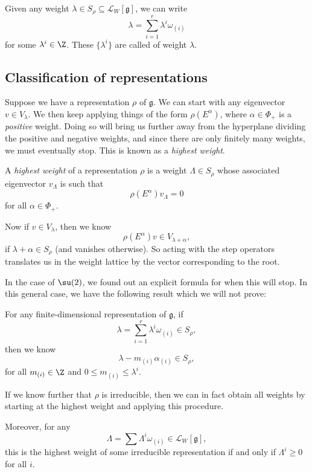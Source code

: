 \documentclass[a4paper]{article}
\begin{document}
Given any weight $\lambda \in S_\rho \subseteq \mathcal{L}_W[\mathfrak{g}]$, we can write
\[
  \lambda = \sum_{i = 1}^r \lambda^i \omega_{(i)}
\]
for some $\lambda^i \in \Z$. These $\{\lambda^i\}$ are called  of weight $\lambda$.

%
\subsection{Classification of representations}
Suppose we have a representation $\rho$ of $\mathfrak{g}$. We can start with any eigenvector $v \in V_\lambda$. We then keep applying things of the form $\rho(E^\alpha)$, where $\alpha \in \Phi_+$ is a \emph{positive} weight. Doing so will bring us further away from the hyperplane dividing the positive and negative weights, and since there are only finitely many weights, we must eventually stop. This is known as a \emph{highest weight}.

\begin{defi}
  A \emph{highest weight} of a representation $\rho$ is a weight $\Lambda \in S_\rho$ whose associated eigenvector $v_\Lambda$ is such that
  \[
    \rho(E^\alpha) v_\Lambda = 0
  \]
  for all $\alpha \in \Phi_+$.
\end{defi}

Now if $v \in V_\lambda$, then we know
\[
  \rho(E^\alpha) v \in V_{\lambda + \alpha},
\]
if $\lambda + \alpha \in S_\rho$ (and vanishes otherwise). So acting with the step operators translates us in the weight lattice by the vector corresponding to the root.

In the case of $\su(2)$, we found out an explicit formula for when this will stop. In this general case, we have the following result which we will not prove:

\begin{thm}
  For any finite-dimensional representation of $\mathfrak{g}$, if
  \[
    \lambda = \sum_{i = 1}^r \lambda^i \omega_{(i)} \in S_\rho,
  \]
  then we know
  \[
    \lambda - m_{(i)} \alpha_{(i)} \in S_\rho,
  \]
  for all $m_{(i)} \in \Z$ and $0 \leq m_{(i)} \leq \lambda^i$.

  If we know further that $\rho$ is irreducible, then we can in fact obtain all weights by starting at the highest weight and applying this procedure.

  Moreover, for any
  \[
    \Lambda = \sum \Lambda^i \omega_{(i)} \in \mathcal{L}_W[\mathfrak{g}],
  \]
  this is the highest weight of some irreducible representation if and only if $\Lambda^i \geq 0$ for all $i$.
\end{thm}
\end{document}
